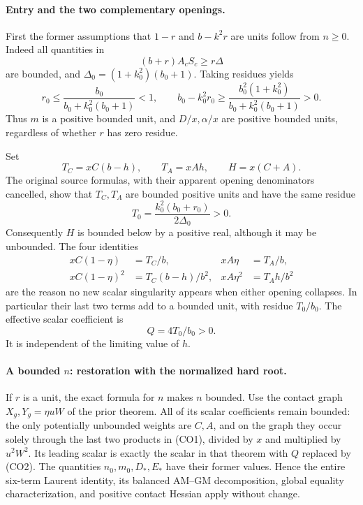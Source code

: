 \paragraph{Entry and the two complementary openings.}
First the former assumptions that $1-r$ and $b-k^2r$ are units follow
from $n\geq0$.  Indeed all quantities in
\[
                 (b+r)A_cS_c\geq r\Delta
\]
are bounded, and $\Delta_0=(1+k_0^2)(b_0+1)$.  Taking residues yields
\[
 r_0\leq\frac{b_0}{b_0+k_0^2(b_0+1)}<1,
 \qquad
 b_0-k_0^2r_0\geq
 \frac{b_0^2(1+k_0^2)}{b_0+k_0^2(b_0+1)}>0.
\]
Thus $m$ is a positive bounded unit, and $D/x,\alpha/x$ are positive
bounded units, regardless of whether $r$ has zero residue.

Set
\[
 T_C=xC(b-h),\qquad T_A=xAh,\qquad H=x(C+A).
\]
The original source formulas, with their apparent opening denominators
cancelled, show that $T_C,T_A$ are bounded positive units and have the
same residue
\[
 T_0=\frac{k_0^2(b_0+r_0)}{2\Delta_0}>0.
\]
Consequently $H$ is bounded below by a positive real, although it may
be unbounded.  The four identities
\begin{align*}
 xC(1-\eta)&=T_C/b,&xA\eta&=T_A/b,\\
 xC(1-\eta)^2&=T_C(b-h)/b^2,&
 xA\eta^2&=T_Ah/b^2                                      \tag{CO1}
\end{align*}
are the reason no new scalar singularity appears when either opening
collapses.  In particular their last two terms add to a bounded unit,
with residue $T_0/b_0$.  The effective scalar coefficient is
\[
                         Q=4T_0/b_0>0.                  \tag{CO2}
\]
It is independent of the limiting value of $h$.

\paragraph{A bounded $n$: restoration with the normalized hard root.}
If $r$ is a unit, the exact formula for $n$ makes $n$ bounded.  Use the
contact graph $X_g,Y_g=\eta uW$ of the prior theorem.  All of its scalar
coefficients remain bounded: the only potentially unbounded weights
are $C,A$, and on the graph they occur solely through the last two
products in (CO1), divided by $x$ and multiplied by $u^2W^2$.
Its leading scalar is exactly the scalar in that theorem with $Q$
replaced by (CO2).  The quantities $n_0,m_0,D_*,E_*$ have their former
values.  Hence the entire six-term Laurent identity, its balanced
AM--GM decomposition, global equality characterization, and positive
contact Hessian apply without change.


